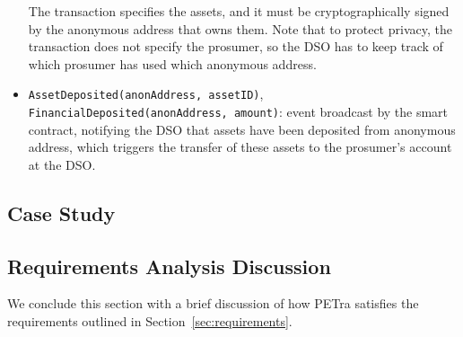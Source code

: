 \begin{itemize}[leftmargin=*]
The transaction specifies the assets, and it must be cryptographically signed by the anonymous address that owns them.
Note that to protect privacy, the transaction does not specify the prosumer, so the DSO has to keep track of which prosumer has used which anonymous address.
\item \texttt{AssetDeposited(anonAddress, assetID)},\\\texttt{FinancialDeposited(anonAddress, amount)}:
event broadcast by the smart contract,
notifying the DSO that assets have been deposited from anonymous address, which triggers the transfer of these assets to the prosumer's account at the DSO.
\end{itemize}

\begin{comment}
\begin{figure}
\begin{tikzpicture}[x=0.7cm,y=0.3cm, font=\small]
\draw [->, >=stealth] (-0.2,0) -- (9,0) node [right] {\texttt{start}, \texttt{end}};
\draw [->, >=stealth] (0,-0.4) -- (0,10) node [above] {\texttt{power}};

\draw [fill=red!15] (1, 0) -- (1, 8) -- (6, 8) -- (6, 0);
\draw [fill=blue!30, opacity=0.5] (3, 0) -- (3, 4) -- (8, 4) -- (8, 0);

\node at (3.5, 9) {$A_1$};
\node at (7, 5) {$A_2$};

\node at (2, 4) {$A_1^2$};
\node at (4.5, 6) {$A_1^3$};
\node at (4.5, 2) {$A_1^1$, $A_2^1$};
\node at (7, 2) {$A_2^2$};

\node at (1, -0.5) {$A_1$.\texttt{start}};
\node at (6, -0.5) {$A_1$.\texttt{end}};
\node at (3, -0.5) {$A_2$.\texttt{start}};
\node at (8, -0.5) {$A_2$.\texttt{end}};

\draw [dashed] (3,4) -- (3,8);
\end{tikzpicture}
\caption{Example of exchanging two assets, $A_1$ and $A_2$, that do not match each other perfectly.
First, asset $A_1$ is divided into three smaller assets $A_1^1$, $A_1^2$, and $A_1^3$, while asset $A_2$ is divided into two smaller assets $A_2^1$ and $A_2^2$.}
\label{fig:assetExchange}
\end{figure}
\end{comment}

\subsection{Case Study}
\label{sec:results}


\subsection{Requirements Analysis Discussion}
 \label{sec:discussion} 
We conclude this section with a brief discussion of how PETra satisfies the requirements outlined in Section~\ref{sec:requirements}.

